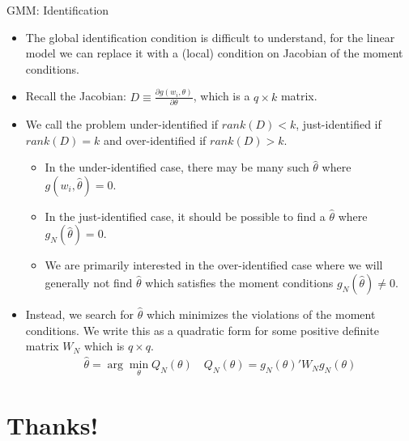 \begin{frame}{GMM: Identification}

\begin{itemize}
\item The global identification condition is difficult to understand, for the linear model we can replace it with a (local) condition on Jacobian of the moment conditions. 
\item Recall the Jacobian: $D \equiv \frac{\partial g(w_i,\theta)}{\partial \theta}$, which is a $q \times k$ matrix. 
\item We call the problem \alert{under-identified} if $rank(D) < k$, \alert{just-identified} if $rank(D) = k$ and \alert{over-identified} if $rank(D) > k$.
\begin{itemize}
\item In the under-identified case, there may be many such $\hat{\theta}$ where $g(w_i,\hat{\theta}) =0$.
\item In the just-identified case, it should be possible to find a $\hat{\theta}$ where $g_N(\hat{\theta})=0$. 
\item We are primarily interested in the over-identified case where we will generally not find $\hat{\theta}$ which satisfies the moment conditions $g_N(\hat{\theta})\neq0$.
\end{itemize}
\item Instead, we search for $\hat{\theta}$ which minimizes the violations of the moment conditions. We write this as a quadratic form for some positive definite matrix $W_N$ which is $q \times q$.
\begin{eqnarray*}
\hat{\theta} = \arg \min_{\theta}  Q_N(\theta) \quad Q_N(\theta)=g_N(\theta)' W_N  g_N(\theta)
\end{eqnarray*}
\end{itemize}
\end{frame}
\section*{Thanks!}

